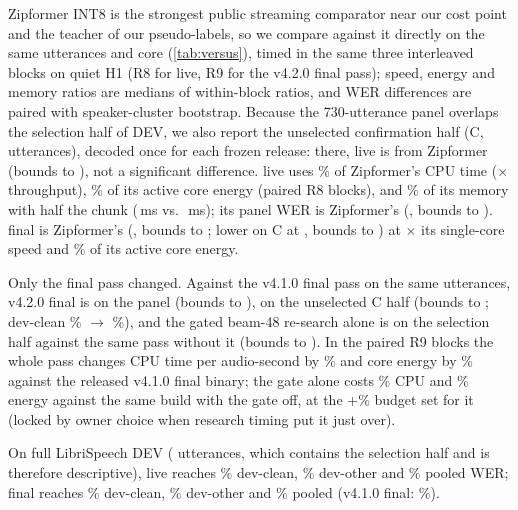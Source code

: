 Zipformer INT8 is the strongest public streaming comparator near our cost point and the teacher of our
pseudo-labels, so we compare against it directly on the same utterances and core (\cref{tab:versus}),
timed in the same three interleaved blocks on quiet H1 (R8 for live, R9 for the v4.2.0 final pass); speed, energy and memory ratios are medians of
within-block ratios, and WER differences are paired with speaker-cluster bootstrap. Because the
730-utterance panel overlaps the selection half of DEV, we also report the unselected confirmation half
(C, \LookCUtts{} utterances), decoded once for each frozen release: there, \ultra{} live is \LookLiveCZipDelta\pp from
Zipformer (bounds \LookLiveCZipLo{} to \LookLiveCZipHi), not a significant difference. \ultra{} live uses \VsCpuPctOne\% of Zipformer's CPU time
(\VsSpeedXOne$\times$ throughput), \VsEnergyPctOne\% of its active core energy (paired R8 blocks), and \VsRssPctOne\% of its
memory with half the chunk (\VsChunkOne\,ms vs.\ \VsZipChunk\,ms); its panel WER is \VsVerdictOne{}
Zipformer's (\VsDeltaOne\pp, bounds \VsLoOne{} to \VsHiOne\pp). \ultra{} final is \VsVerdictTwo{}
Zipformer's (\VsDeltaTwo\pp, bounds \VsLoTwo{} to \VsHiTwo\pp; lower on C at \FinCZipDelta\pp, bounds \FinCZipLo{} to \FinCZipHi) at
\VsSpeedXTwo$\times$ its single-core speed and \VsEnergyPctTwo\% of its active core energy.

 Only the final pass changed. Against the v4.1.0 final pass on the same utterances,
v4.2.0 final is \FinPanelPrevDelta\pp on the panel (bounds \FinPanelPrevLo{} to \FinPanelPrevHi), \FinCPrevDelta\pp on
the unselected C half (bounds \FinCPrevLo{} to \FinCPrevHi; dev-clean \FinPrevCClean\% $\to$ \FinCClean\%), and the gated beam-48
re-search alone is \FinSBaseDelta\pp on the selection half against the same pass without it (bounds \FinSBaseLo{} to
\FinSBaseHi). In the paired R9 blocks the whole pass changes CPU time per audio-second by \FinCostCpuPct\% and core
energy by \FinCostEnergyPct\% against the released v4.1.0 final binary; the gate alone costs \FinGateCpuPct\% CPU and
\FinGateEnergyPct\% energy against the same build with the gate off, at the +\FinGateBudgetPct\% budget set for it (locked by owner choice when
research timing put it just over).

On full LibriSpeech DEV (\RelFullUtts{} utterances, which contains the selection half and is therefore
descriptive), \ultra{} live reaches \LookLiveFullClean\% dev-clean, \LookLiveFullOther\% dev-other
and \LookLiveFullWer\% pooled WER; \ultra{} final reaches \FinFullClean\% dev-clean, \FinFullOther\% dev-other and
\FinFullWer\% pooled (v4.1.0 final: \LookFinalFullWer\%).


